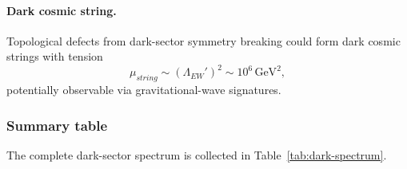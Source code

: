 \documentclass[a4paper,7pt,oneside,openany]{book}
\begin{document}
\paragraph{Dark cosmic string.}
Topological defects from dark-sector symmetry breaking could form 
dark cosmic strings with tension
\begin{equation}
\mu_{string}
\sim
(\Lambda_{EW}')^{2}
\sim
10^{6}\,\text{GeV}^{2},
\label{eq:string-tension}
\end{equation}
potentially observable via gravitational-wave signatures.

\subsubsection{Summary table}

The complete dark-sector spectrum is collected in 
Table~\ref{tab:dark-spectrum}.
\end{document}
